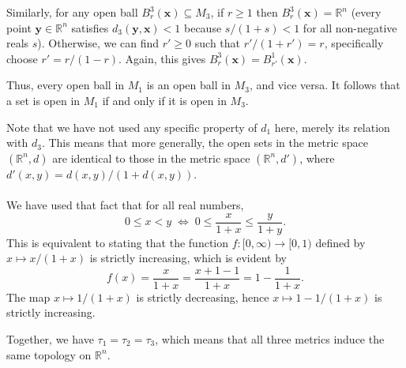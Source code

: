 \documentclass[11pt]{article}
\def\R{\mathbb{R}}
\renewcommand\vec\boldsymbol
\def\vx{\vec{x}}
\def\vy{\vec{y}}
\theoremstyle{remark}
\begin{document}
\begin{itemize}
    Similarly, for any open ball $B^3_r(\vx) \subseteq M_3$, if $r \geq 1$ then
    $B^3_r(\vx) = \R^n$ (every point $\vy \in \R^n$ satisfies $d_3(\vy,
    \vx) < 1$ because $s / (1 + s) < 1$ for all non-negative reals $s$). Otherwise,
    we can find $r' \geq 0$ such that $r' / (1 + r') = r$, specifically choose $r' =
    r / (1 - r)$. Again, this gives $B^3_r(\vx) = B^1_{r'}(\vx)$.

    Thus, every open ball in $M_1$ is an open ball in $M_3$, and vice versa. It
    follows that a set is open in $M_1$ if and only if it is open in $M_3$.

    Note that we have not used any specific property of $d_1$ here, merely its
    relation with $d_3$. This means that more generally, the open sets in the metric
    space $(\R^n, d)$ are identical to those in the metric space $(\R^n, d')$, where
    $d'(x, y) = d(x, y) / (1 + d(x, y))$.  \\~\\

    We have used that fact that for all real numbers, \[
        0 \leq x < y \;\Longleftrightarrow\; 0 \leq \frac{x}{1 + x} \leq \frac{y}{1
        + y}.
    \] This is equivalent to stating that the function $f\colon [0, \infty) \to [0,
    1)$ defined by $x \mapsto x / (1 + x)$ is strictly increasing,
    which is evident by \[
        f(x) = \frac{x}{1 + x} = \frac{x + 1 - 1}{1 + x} = 1 - \frac{1}{1 + x}.
    \] The map $x \mapsto 1 / (1 + x)$ is strictly decreasing, hence $x \mapsto 1 -
    1 / (1 + x)$ is strictly increasing.
    \end{itemize}
    
    Together, we have $\tau_1 = \tau_2 = \tau_3$, which means that all three metrics
    induce the same topology on $\R^n$.
\end{document}
